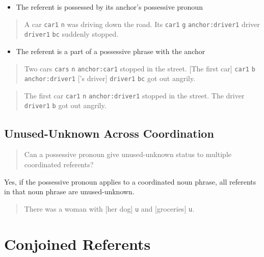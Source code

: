 \documentclass[
]{book}
\providecommand{\tightlist}{%
  \setlength{\itemsep}{0pt}\setlength{\parskip}{0pt}}
\begin{document}
\begin{itemize}
\tightlist
\item
  The referent is possessed by its anchor's possessive pronoun
\end{itemize}

\begin{quote}
A car \texttt{car1} \texttt{n} was driving down the road.
Its \texttt{car1} \texttt{g} \texttt{anchor:driver1} driver \texttt{driver1} \texttt{bc} suddenly stopped.
\end{quote}

\begin{itemize}
\tightlist
\item
  The referent is a part of a possessive phrase with the anchor
\end{itemize}

\begin{quote}
Two cars \texttt{cars} \texttt{n} \texttt{anchor:car1} stopped in the street.
{[}The first car{]} \texttt{car1} \texttt{b} \texttt{anchor:driver1}
{[}'s driver{]} \texttt{driver1} \texttt{bc} got out angrily.
\end{quote}

\begin{quote}
The first car \texttt{car1} \texttt{n} \texttt{anchor:driver1} stopped in the street.
The driver \texttt{driver1} \texttt{b} got out angrily.
\end{quote}

\hypertarget{unused-unknown-across-coordination}{%
\subsection{Unused-Unknown Across Coordination}\label{unused-unknown-across-coordination}}

\begin{quote}
Can a possessive pronoun give unused-unknown status to multiple coordinated referents?
\end{quote}

Yes,
if the possessive pronoun applies to a coordinated noun phrase,
all referents in that noun phrase are unused-unknown.

\begin{quote}
There was a woman with {[}her dog{]} \texttt{u} and {[}groceries{]} \texttt{u}.
\end{quote}

\hypertarget{conjoined-referents}{%
\section{Conjoined Referents}\label{conjoined-referents}}
\end{document}

